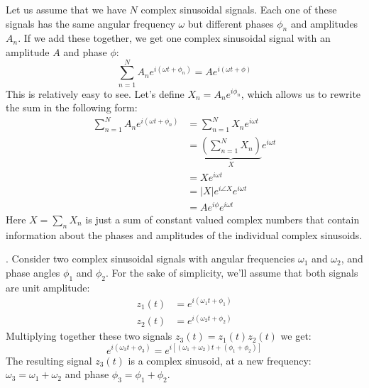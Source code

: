 Let us assume that we have $N$ complex sinusoidal signals. Each one of these signals has
the same angular frequency $\omega$ but different phases $\phi_n$ and amplitudes $A_n$.
If we add these together, we get one complex sinusoidal signal with an amplitude $A$ and phase $\phi$:
\begin{equation}
  \sum_{n=1}^N A_n e^{i(\omega t + \phi_n)} = A e^{i (\omega t + \phi)}
\end{equation}
This is relatively easy to see. Let's define $X_n = A_n e^{i\phi_n}$,
which allows us to rewrite the sum in the following form:
\begin{align}
  \sum_{n=1}^N A_n e^{i(\omega t + \phi_n)} & = \sum_{n=1}^N X_n e^{i\omega t}                               \\
                                            & = \underbrace{\left(\sum_{n=1}^N X_n\right)}_{X} e^{i\omega t} \\
                                            & = X e^{i\omega t}                                              \\
                                            & = |X| e^{i\angle X} e^{i\omega t}                              \\
                                            & = A e^{i \phi} e^{i\omega t}
  \label{eq:sum_sinusoids}
\end{align}
Here $X=\sum_n X_n$ is just a sum of constant valued complex numbers that
contain information about the phases and amplitudes of the individual complex sinusoids.

.
Consider two complex sinusoidal signals with angular frequencies $\omega_1$ and $\omega_2$,
and phase angles $\phi_1$ and $\phi_2$. For the sake of simplicity, we'll assume that both signals are unit amplitude:
\begin{align}
  z_1(t) & =  e^{i(\omega_1 t + \phi_1)} \\
  z_2(t) & =  e^{i(\omega_2 t + \phi_2)}
\end{align}
Multiplying together these two signals $z_3(t) = z_1(t)z_2(t)$ we get:
\begin{equation}
  \boxed{e^{i(\omega_3 t + \phi_3)}  = e^{i[(\omega_1 + \omega_2) t + (\phi_1+\phi_2)]}}
  \label{eq:freqmix}
\end{equation}
The resulting signal $z_3(t)$ is a complex sinusoid, at a new frequency: $\omega_3 = \omega_1 + \omega_2$ and
phase $\phi_3=\phi_1+\phi_2$.

